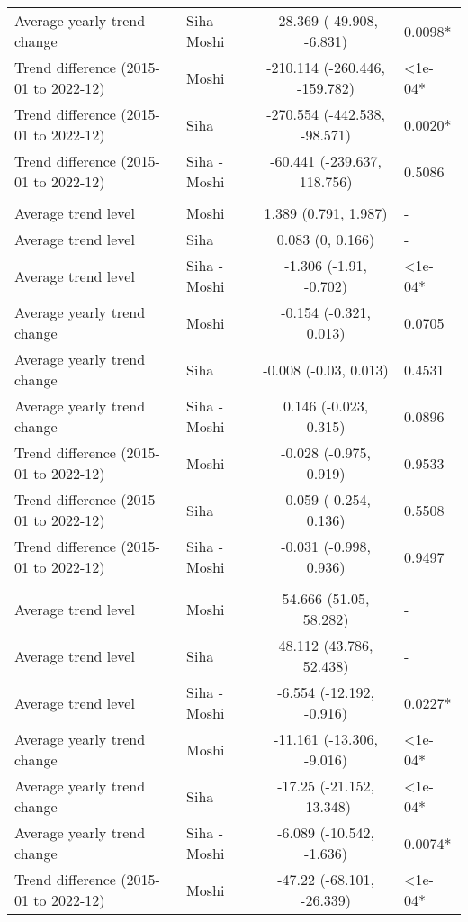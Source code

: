 \begin{longtable}{l|lcl}
Average yearly trend change & Siha - Moshi & -28.369 (-49.908, -6.831) & 0.0098* \\ 
Trend difference (2015-01 to 2022-12) & Moshi & -210.114 (-260.446, -159.782) & <1e-04* \\ 
Trend difference (2015-01 to 2022-12) & Siha & -270.554 (-442.538, -98.571) & 0.0020* \\ 
Trend difference (2015-01 to 2022-12) & Siha - Moshi & -60.441 (-239.637, 118.756) & 0.5086 \\ 
\midrule\addlinespace[2.5pt]
\multicolumn{4}{l}{Leprosy} \\[2.5pt] 
\midrule\addlinespace[2.5pt]
Average trend level & Moshi & 1.389 (0.791, 1.987) & - \\ 
Average trend level & Siha & 0.083 (0, 0.166) & - \\ 
Average trend level & Siha - Moshi & -1.306 (-1.91, -0.702) & <1e-04* \\ 
Average yearly trend change & Moshi & -0.154 (-0.321, 0.013) & 0.0705 \\ 
Average yearly trend change & Siha & -0.008 (-0.03, 0.013) & 0.4531 \\ 
Average yearly trend change & Siha - Moshi & 0.146 (-0.023, 0.315) & 0.0896 \\ 
Trend difference (2015-01 to 2022-12) & Moshi & -0.028 (-0.975, 0.919) & 0.9533 \\ 
Trend difference (2015-01 to 2022-12) & Siha & -0.059 (-0.254, 0.136) & 0.5508 \\ 
Trend difference (2015-01 to 2022-12) & Siha - Moshi & -0.031 (-0.998, 0.936) & 0.9497 \\ 
\midrule\addlinespace[2.5pt]
\multicolumn{4}{l}{Malaria} \\[2.5pt] 
\midrule\addlinespace[2.5pt]
Average trend level & Moshi & 54.666 (51.05, 58.282) & - \\ 
Average trend level & Siha & 48.112 (43.786, 52.438) & - \\ 
Average trend level & Siha - Moshi & -6.554 (-12.192, -0.916) & 0.0227* \\ 
Average yearly trend change & Moshi & -11.161 (-13.306, -9.016) & <1e-04* \\ 
Average yearly trend change & Siha & -17.25 (-21.152, -13.348) & <1e-04* \\ 
Average yearly trend change & Siha - Moshi & -6.089 (-10.542, -1.636) & 0.0074* \\ 
Trend difference (2015-01 to 2022-12) & Moshi & -47.22 (-68.101, -26.339) & <1e-04* \\ 

\end{longtable}
